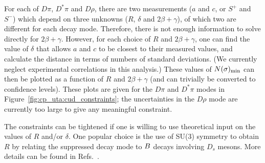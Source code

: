 For each of $D\pi$, $D^*\pi$ and $D\rho$, 
there are two measurements ($a$ and $c$, or $S^+$ and $S^-$) 
which depend on three unknowns ($R$, $\delta$ and $2\beta+\gamma$), 
of which two are different for each decay mode. 
Therefore, there is not enough information to solve directly for $2\beta+\gamma$. 
However, for each choice of $R$ and $2\beta+\gamma$, 
one can find the value of $\delta$ that allows $a$ and $c$ to be closest 
to their measured values, 
and calculate the distance in terms of numbers of standard deviations.
(We currently neglect experimental correlations in this analysis.) 
These values of $N(\sigma)_{\rm min}$ can then be plotted 
as a function of $R$ and $2\beta+\gamma$
(and can trivially be converted to confidence levels). 
These plots are given for the $D\pi$ and $D^*\pi$ modes 
in Figure~\ref{fig:cp_uta:cud_constraints}; 
the uncertainties in the $D\rho$ mode are currently too large 
to give any meaningful constraint.

The constraints can be tightened if one is willing 
to use theoretical input on the values of $R$ and/or $\delta$. 
One popular choice is the use of SU(3) symmetry to obtain 
$R$ by relating the suppressed decay mode to $B$ decays 
involving $D_s$ mesons. 
More details can be found 
in Refs.~\cite{Charles:2004jd,Bona:2005vz}.

